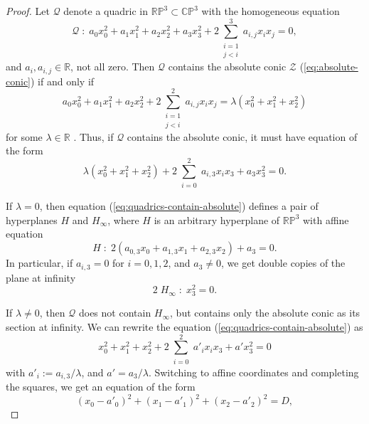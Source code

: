 \documentclass[10pt, a4paper]{article}
\theoremstyle{BoldTopSpacing}
\theoremstyle{BoldTopSpacing}
\theoremstyle{BoldTopSpacing}
\theoremstyle{BoldTopBottomSpacing}
\theoremstyle{BoldTopSpacing}
\theoremstyle{BoldTopBottomSpacing}
\theoremstyle{remark}
\begin{document}
\begin{proof}
Let $\mathcal{Q}$ denote a quadric in $\mathbb{R}\mathbb{P}^3 \subset \mathbb{C}\mathbb{P}^3$ with the homogeneous equation
\begin{equation}
    \mathcal{Q} \; : \; a_{0}x_{0}^2 + a_{1}x_{1}^2 + a_{2}x_{2}^2 + a_{3}x_{3}^2 + 2 \sum_{\substack{i = 1 \\ j < i}}^{3} a_{i, j} x_{i} x_{j} = 0,
\end{equation}
and $a_{i}, a_{i, j} \in \mathbb{R}$, not all zero. Then $\mathcal{Q}$ contains the absolute conic $\mathcal{Z}$ (\ref{eq:absolute-conic}) if and only if
\begin{equation*}
    a_{0}x_{0}^2 + a_{1}x_{1}^2 + a_{2}x_{2}^2 + 2 \sum_{\substack{i = 1 \\ j < i}}^{2} a_{i, j} x_{i} x_{j} = \lambda \left( x_{0}^2 + x_{1}^2 + x_{2}^2 \right)
\end{equation*}
for some $\lambda \in \mathbb{R}$ \cite[\textcolor{CitationColor}{Lemma~6.1.10}]{alveroAnalyticProjectiveGeometry}. Thus, if $\mathcal{Q}$ contains the absolute conic, it must have equation of the form
\begin{equation}
\label{eq:quadrics-contain-absolute}
   \lambda \left( x_{0}^2 + x_{1}^2 + x_{2}^2 \right) + 2 \sum_{\substack{i = 0}}^{2} a_{i, 3} x_{i} x_{3} + a_{3} x_{3}^2 = 0.
\end{equation}
\par
If $\lambda = 0$, then equation (\ref{eq:quadrics-contain-absolute}) defines a pair of hyperplanes $H$ and $H_{\infty}$, where $H$ is an arbitrary hyperplane of $\mathbb{R}\mathbb{P}^3$ with affine equation
\[
    H \; : \; 2 \left( a_{0, 3} x_{0} + a_{1, 3} x_{1} + a_{2, 3} x_{2} \right) + a_{3} = 0.
\]
In particular, if $a_{i, 3} = 0$ for $i=0,1,2$, and $a_{3} \neq 0$, we get double copies of the plane at infinity
\[
    2 \; H_{\infty} \; : \; x_{3}^2 = 0.
\]
\par
If $\lambda \neq 0$, then $\mathcal{Q}$ does not contain $H_{\infty}$, but contains only the absolute conic as its section at infinity. We can rewrite the equation (\ref{eq:quadrics-contain-absolute}) as
\[
    x_{0}^2 + x_{1}^2 + x_{2}^2 + 2 \sum_{\substack{i = 0}}^{2} a'_{i} x_{i} x_{3} + a' x_{3}^2 = 0
\]
with $a'_{i} := a_{i, 3} / \lambda$, and $a' = a_{3} / \lambda$. Switching to affine coordinates and completing the squares, we get an equation of the form
\begin{equation}
\label{eq:real-or-imaginary-sphere}
(x_{0} - a'_{0})^2 + (x_{1} - a'_{1})^2  + (x_{2} - a'_{2})^2 = D,

\end{equation}
\end{proof}
\end{document}
